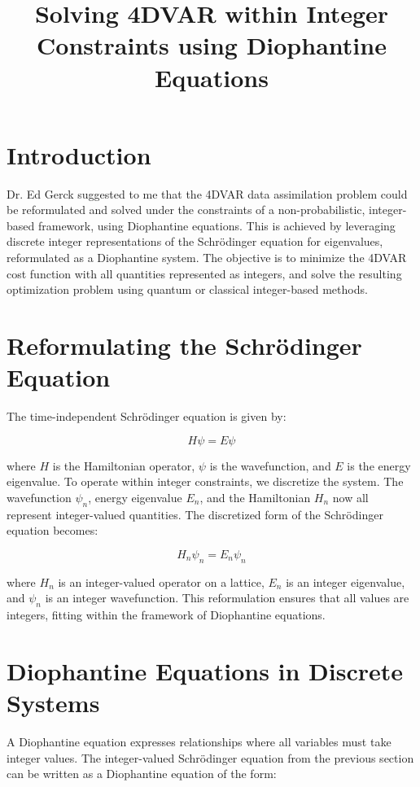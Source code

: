 \documentclass{article}
\title{Solving 4DVAR within Integer Constraints using Diophantine Equations}
\author{}
\date{}
\begin{document}
\maketitle

\section{Introduction}

Dr. Ed Gerck suggested to me that the 4DVAR data assimilation problem could be reformulated and solved under the constraints of a non-probabilistic, integer-based framework, using Diophantine equations. This is achieved by leveraging discrete integer representations of the Schrödinger equation for eigenvalues, reformulated as a Diophantine system. The objective is to minimize the 4DVAR cost function with all quantities represented as integers, and solve the resulting optimization problem using quantum or classical integer-based methods.

\section{Reformulating the Schrödinger Equation}

The time-independent Schrödinger equation is given by:

\[
H \psi = E \psi
\]

where \( H \) is the Hamiltonian operator, \( \psi \) is the wavefunction, and \( E \) is the energy eigenvalue. To operate within integer constraints, we discretize the system. The wavefunction \( \psi_n \), energy eigenvalue \( E_n \), and the Hamiltonian \( H_n \) now all represent integer-valued quantities. The discretized form of the Schrödinger equation becomes:

\[
H_n \psi_n = E_n \psi_n
\]

where \( H_n \) is an integer-valued operator on a lattice, \( E_n \) is an integer eigenvalue, and \( \psi_n \) is an integer wavefunction. This reformulation ensures that all values are integers, fitting within the framework of Diophantine equations.

\section{Diophantine Equations in Discrete Systems}

A Diophantine equation expresses relationships where all variables must take integer values. The integer-valued Schrödinger equation from the previous section can be written as a Diophantine equation of the form:
\end{document}
